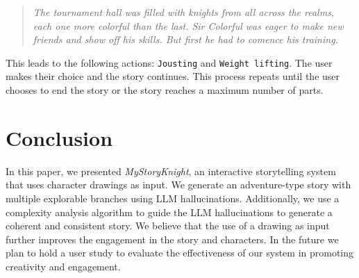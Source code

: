 \documentclass[submit,techrep,english]{ipsj}
\begin{document}
\begin{quote}
    \textit{The tournament hall was filled with knights from all across the realms, each one more colorful than the last. Sir Colorful was eager to make new friends and show off his skills. But first he had to comence his training.}
\end{quote}

\vspace{10pt} %

This leads to the following actions: \verb|Jousting| and \verb|Weight lifting|. The user makes their choice and the story continues. This process repeats until the user chooses to end the story or the story reaches a maximum number of parts.

\section{Conclusion}
\label{sec:conclusion}
In this paper, we presented \textit{MyStoryKnight}, an interactive storytelling system that uses character drawings as input. We generate an adventure-type story with multiple explorable branches using LLM hallucinations. Additionally, we use a complexity analysis algorithm to guide the LLM hallucinations to generate a coherent and consistent story. We believe that the use of a drawing as input further improves the engagement in the story and characters. In the future we plan to hold a user study to evaluate the effectiveness of our system in promoting creativity and engagement.





\end{document}
